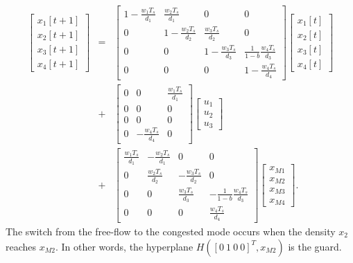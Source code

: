 \begin{eqnarray}
\left[\begin{array}{c}
x_1[t+1]\\
x_2[t+1]\\
x_3[t+1]\\
x_4[t+1]\end{array}\right] & = & \left[\begin{array}{cccc}
1-\frac{w_1T_s}{d_1} & \frac{w_2T_s}{d_1} & 0 & 0\\
0 & 1-\frac{w_2T_s}{d_2} & \frac{w_3T_s}{d_2} & 0\\
0 & 0 & 1-\frac{w_3T_s}{d_3} & \frac{1}{1-b}\frac{w_4T_s}{d_3}\\
0 & 0 & 0 & 1-\frac{w_4T_s}{d_4}\end{array}\right]
\left[\begin{array}{c}
x_1[t]\\
x_2[t]\\
x_3[t]\\
x_4[t]\end{array}\right] \nonumber\\
& + & \left[\begin{array}{ccc}
0 & 0 & \frac{w_1T_s}{d_1}\\
0 & 0 & 0\\
0 & 0 & 0\\
0 & -\frac{w_4T_s}{d_4} & 0\end{array}\right]\left[\begin{array}{c}
u_1\\
u_2\\
u_3\end{array}\right] \nonumber\\
& + & \left[\begin{array}{cccc}
\frac{w_1T_s}{d_1} & -\frac{w_2T_s}{d_1} & 0 & 0\\
0 & \frac{w_2T_s}{d_2} & -\frac{w_3T_s}{d_2} & 0\\
0 & 0 & \frac{w_3T_s}{d_3} & -\frac{1}{1-b}\frac{w_4T_s}{d_3}\\
0 & 0 & 0 & \frac{w_4T_s}{d_4}\end{array}\right]
\left[\begin{array}{c}
x_{M1}\\
x_{M2}\\
x_{M3}\\
x_{M4}\end{array}\right]. \label{cflow}
\end{eqnarray}
The switch from the free-flow to the congested mode occurs when the density
 $x_2$ reaches $x_{M2}$. In other words, the hyperplane
$H([0 ~ 1 ~ 0 ~ 0]^T, x_{M2})$ is the guard.

